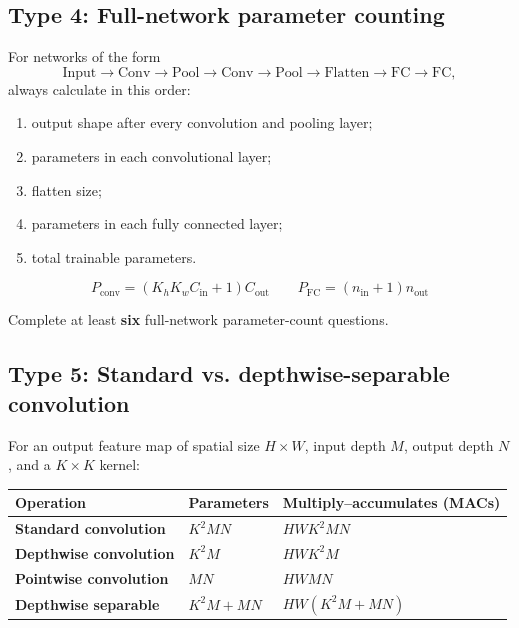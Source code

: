 \documentclass[11pt]{article}
\begin{document}
\subsection{Type 4: Full-network parameter counting}

For networks of the form
\[
\text{Input}\to\text{Conv}\to\text{Pool}\to\text{Conv}\to\text{Pool}
\to\text{Flatten}\to\text{FC}\to\text{FC},
\]
always calculate in this order:

\begin{enumerate}
  \item output shape after every convolution and pooling layer;
  \item parameters in each convolutional layer;
  \item flatten size;
  \item parameters in each fully connected layer;
  \item total trainable parameters.
\end{enumerate}

\begin{formulabox}
\[
\boxed{P_{\mathrm{conv}}=(K_hK_wC_{\mathrm{in}}+1)C_{\mathrm{out}}}
\qquad
\boxed{P_{\mathrm{FC}}=(n_{\mathrm{in}}+1)n_{\mathrm{out}}}
\]
\end{formulabox}

Complete at least \textbf{six} full-network parameter-count questions.

\subsection{Type 5: Standard vs. depthwise-separable convolution}

For an output feature map of spatial size \(H\times W\), input depth \(M\), output depth \(N\), and a \(K\times K\) kernel:

\begin{center}
\begin{tabularx}{\textwidth}{>{\bfseries}p{3.2cm} X X}
\toprule
Operation & Parameters & Multiply--accumulates (MACs) \\
\midrule
Standard convolution & \(K^2MN\) & \(HWK^2MN\) \\
Depthwise convolution & \(K^2M\) & \(HWK^2M\) \\
Pointwise convolution & \(MN\) & \(HWMN\) \\
Depthwise separable & \(K^2M+MN\) & \(HW(K^2M+MN)\) \\
\bottomrule
\end{tabularx}
\end{center}
\end{document}
